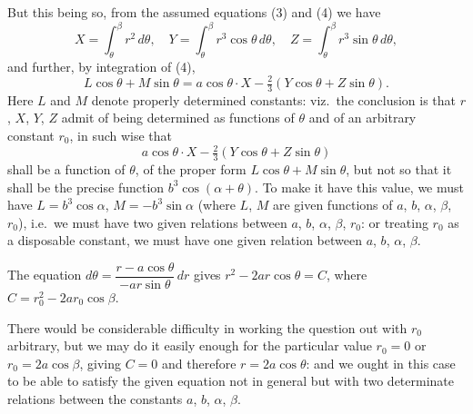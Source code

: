 \documentclass[11pt,a4paper]{article}
\begin{document}
But this being so, from the assumed equations (3) and (4) we have
\[
X = \int_\theta^\beta r^2\,d\theta,\quad Y = \int_\theta^\beta r^3\cos\theta\,d\theta,\quad Z = \int_\theta^\beta r^3\sin\theta\,d\theta,
\]
and further, by integration of (4),
\[
L\cos\theta + M\sin\theta = a\cos\theta\cdot X - \tfrac{2}{3}(Y\cos\theta + Z\sin\theta).
\]
Here $L$ and $M$ denote properly determined constants: viz.\ the conclusion is that $r$, $X$, $Y$, $Z$ admit of being determined as functions of $\theta$ and of an arbitrary constant $r_0$, in such wise that
\[
a\cos\theta\cdot X - \tfrac{2}{3}(Y\cos\theta + Z\sin\theta)
\]
shall be a function of $\theta$, of the proper form $L\cos\theta + M\sin\theta$, but not so that it shall be the precise function $b^3\cos(\alpha + \theta)$. To make it have this value, we must have $L = b^3\cos\alpha$, $M = -b^3\sin\alpha$ (where $L$, $M$ are given functions of $a$, $b$, $\alpha$, $\beta$, $r_0$), i.e.\ we must have two given relations between $a$, $b$, $\alpha$, $\beta$, $r_0$: or treating $r_0$ as a disposable constant, we must have one given relation between $a$, $b$, $\alpha$, $\beta$.

The equation $d\theta = \dfrac{r-a\cos\theta}{-ar\sin\theta}\,dr$ gives $r^2 - 2ar\cos\theta = C$, where $C = r_0^2 - 2ar_0\cos\beta$.

There would be considerable difficulty in working the question out with $r_0$ arbitrary, but we may do it easily enough for the particular value $r_0 = 0$ or $r_0 = 2a\cos\beta$, giving $C = 0$ and therefore $r = 2a\cos\theta$: and we ought in this case to be able to satisfy the given equation not in general but with two determinate relations between the constants $a$, $b$, $\alpha$, $\beta$.
\end{document}
